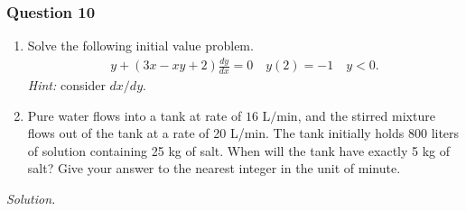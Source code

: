 \documentclass[12pt]{article}
\begin{document}
\subsubsection*{Question 10}
\begin{enumerate}[label=\textbf{(\alph*)}]
    \itemsep 0em
    \item Solve the following initial value problem. \begin{align*}
        y+\left(3x-xy+2\right)\frac{dy}{dx}=0\quad y\left(2\right)=-1\quad y<0.
    \end{align*}
    \textit{Hint:} consider $dx/dy$.
    \item Pure water flows into a tank at rate of $16\text{ L/min}$, and the stirred mixture flows out of the tank at a rate of 20 L/min. The tank initially holds 800 liters of solution containing 25 kg of salt. When will the tank have exactly 5 kg of salt? Give your answer to the nearest integer in the unit of minute.
\end{enumerate}
\textit{Solution.}
\end{document}
